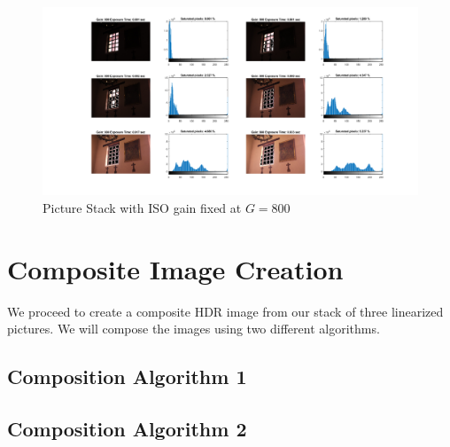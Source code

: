\documentclass[a4paper]{article}
\begin{document}
\begin{figure}[H]
\centering
\includegraphics[trim=7cm 1cm 1cm 0cm clip, scale=.4]{Chapel_Histogram_set.png}
\caption{Picture Stack with ISO gain fixed at $G = 800$}
\label{fig:PicStack}
\end{figure}
\FloatBarrier
\section{Composite Image Creation}
We proceed to create a composite HDR image from our stack of three linearized pictures. We will compose the images using two different algorithms.

\subsection{Composition Algorithm 1}

\subsection{Composition Algorithm 2}
\end{document}
